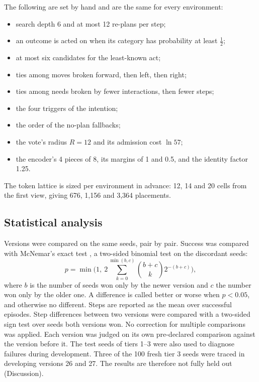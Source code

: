 \documentclass{article}
\begin{document}
The following are set by hand and are the same for every environment:
\begin{itemize}
    \item search depth 6 and at most 12 re-plans per step;
    \item an outcome is acted on when its category has probability at least $\tfrac12$;
    \item at most six candidates for the least-known act;
    \item ties among moves broken forward, then left, then right;
    \item ties among needs broken by fewer interactions, then fewer steps;
    \item the four triggers of the intention;
    \item the order of the no-plan fallbacks;
    \item the vote's radius $R=12$ and its admission cost $\ln 57$;
    \item the encoder's 4 pieces of 8, its margins of 1 and 0.5, and the identity factor 1.25.
\end{itemize}
The token lattice is sized per environment in advance: 12, 14 and 20 cells from the first view, giving 676, 1,156 and 3,364 placements.

\subsection{Statistical analysis}

Versions were compared on the same seeds, pair by pair. Success was compared with McNemar's exact test \cite{McNemar1947}, a two-sided binomial test on the discordant seeds:
\begin{equation} \label{eq:mcnemar}
    p=\min\Big(1,\ 2\sum_{k=0}^{\min(b,c)}\binom{b+c}{k}2^{-(b+c)}\Big),
\end{equation}
where $b$ is the number of seeds won only by the newer version and $c$ the number won only by the older one. A difference is called better or worse when $p<0.05$, and otherwise no different. Steps are reported as the mean over successful episodes. Step differences between two versions were compared with a two-sided sign test over seeds both versions won. No correction for multiple comparisons was applied. Each version was judged on its own pre-declared comparison against the version before it. The test seeds of tiers 1--3 were also used to diagnose failures during development. Three of the 100 fresh tier 3 seeds were traced in developing versions 26 and 27. The results are therefore not fully held out (Discussion).
\end{document}
